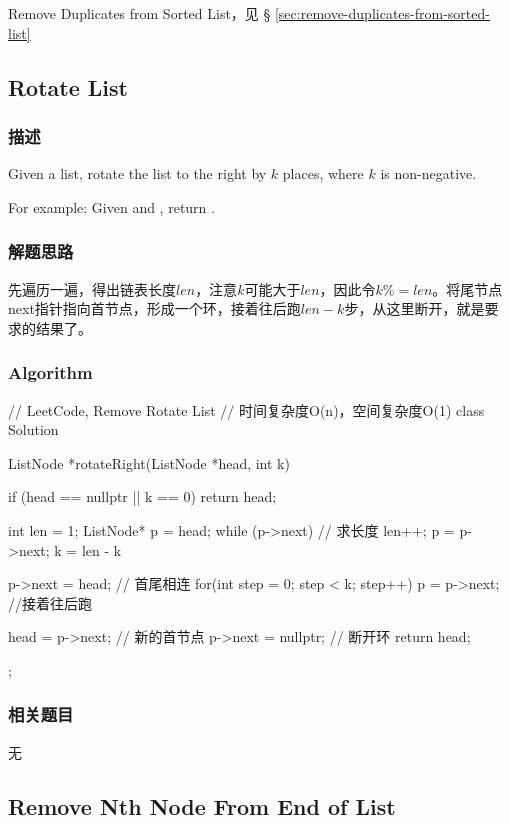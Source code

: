 \begindot
\item Remove Duplicates from Sorted List，见 \S 
\ref{sec:remove-duplicates-from-sorted-list}
\myenddot


\subsection{Rotate List}
\label{sec:rotate-list}


\subsubsection{描述}
Given a list, rotate the list to the right by $k$ places, where $k$ is 
non-negative.

For example:
Given  and , return 
.


\subsubsection{解题思路}
先遍历一遍，得出链表长度$len$，注意$k$可能大于$len$，因此令$k \%= 
len$。将尾节点next指针指向首节点，形成一个环，接着往后跑$len-k$步，从这里断开，就是要求的结果了。


\subsubsection{Algorithm}
\begin{Code}
	// LeetCode, Remove Rotate List
	// 时间复杂度O(n)，空间复杂度O(1)
	class Solution {
		ListNode *rotateRight(ListNode *head, int k) {
			if (head == nullptr || k == 0) return head;
			
			int len = 1;
			ListNode* p = head;
			while (p->next) { // 求长度
				len++;
				p = p->next;
			}
			k = len - k %
			
			p->next = head; // 首尾相连
			for(int step = 0; step < k; step++) 
				p = p->next;  //接着往后跑
			
			head = p->next; // 新的首节点
			p->next = nullptr; // 断开环
			return head;
		}
	};
\end{Code}


\subsubsection{相关题目}

\begindot
\item 无
\myenddot


\subsection{Remove Nth Node From End of List}
\label{sec:remove-nth-node-from-end-of-list}


